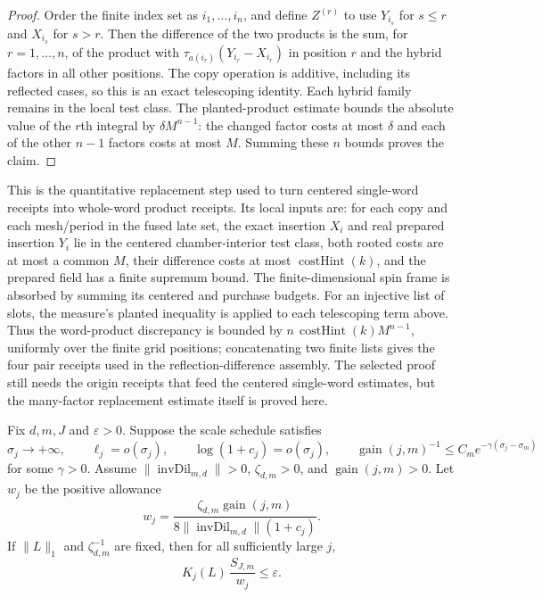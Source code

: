\begin{proof}
Order the finite index set as $i_1,\ldots,i_n$, and define $Z^{(r)}$ to use
$Y_{i_s}$ for $s\leq r$ and $X_{i_s}$ for $s>r$. Then the difference of the
two products is the sum, for $r=1,\ldots,n$, of the product with
$\tau_{a(i_r)}(Y_{i_r}-X_{i_r})$ in position $r$ and the hybrid
factors in all other positions. The copy operation is additive, including
its reflected cases, so this is an exact telescoping identity. Each hybrid
family remains in the local test class. The planted-product estimate bounds the
absolute value of the $r$th integral by $\delta M^{n-1}$: the changed factor
costs at most $\delta$ and each of the other $n-1$ factors costs at most
$M$. Summing these $n$ bounds proves the claim.
\end{proof}

\begin{remark}
\label{rem:ex-public-layout-receipt}
This is the quantitative replacement step used to turn centered single-word
receipts into whole-word product receipts. Its local inputs are: for each
copy and each mesh/period in the
fused late set, the exact insertion $X_i$ and real prepared insertion $Y_i$
lie in the centered chamber-interior test class, both rooted costs are at most a common
$M$, their difference costs at most $\operatorname{costHint}(k)$, and the
prepared field has a finite supremum bound. The finite-dimensional spin
frame is absorbed by summing its centered and purchase budgets. For an
injective list of slots, the measure's planted inequality is applied to each
telescoping term above. Thus the word-product discrepancy is bounded by
$n\,\operatorname{costHint}(k)M^{n-1}$, uniformly over the finite grid
positions; concatenating two finite lists gives the four pair receipts used
in the reflection-difference assembly. The selected proof still needs the
origin receipts that feed the centered single-word estimates, but the
many-factor replacement estimate itself is proved here.
\end{remark}

\begin{lemma}
\label{lem:ex-public-radial-choice}
Fix $d,m,J$ and $\varepsilon>0$. Suppose the scale schedule satisfies
\[
\sigma_j\longrightarrow+\infty,\qquad
\ell_j=o(\sigma_j),\qquad \log(1+c_j)=o(\sigma_j),\qquad
 \operatorname{gain}(j,m)^{-1}\leq C_m e^{-\gamma(\sigma_j-\sigma_m)}
\]
for some $\gamma>0$. Assume $\|\operatorname{invDil}_{m,d}\|>0$,
$\zeta_{d,m}>0$, and $\operatorname{gain}(j,m)>0$. Let $w_j$ be the positive allowance
\[
 w_j=\frac{\zeta_{d,m}\operatorname{gain}(j,m)}
              {8\|\operatorname{invDil}_{m,d}\|(1+c_j)}.
\]
If $\|L\|_1$ and $\zeta_{d,m}^{-1}$ are fixed, then for all sufficiently
large $j$,
\[
              K_j(L)\,\frac{S_{J,m}}{w_j}\leq\varepsilon.
\]
\end{lemma}

